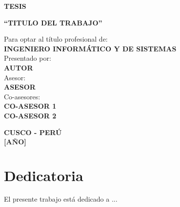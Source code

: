 \documentclass[12pt,oneside,a4paper]{book}
\theoremstyle{definition}
\begin{document}
\begin{center}
\vspace*{-0.6in}
\textbf{TESIS}\\
\topline
\vspace*{0.1in}
\begin{large}
\textbf{``TITULO DEL TRABAJO''} \\
\end{large}
\vspace*{0.08in}
\downline
\vspace*{0.25in}

\begin{minipage}{\linewidth}
  \large
  \centering    
  \begin{minipage}{0.45\linewidth}
  \end{minipage}
  \hspace{0.28\linewidth}
  \begin{minipage}{0.7\linewidth}
    \begin{normalsize}
    Para optar al título profesional de:
    \vspace*{-0.1in}
    \\\textbf{INGENIERO INFORMÁTICO Y DE SISTEMAS}\\
    Presentado por: \vspace*{-0.1in}
    \\\textbf{AUTOR}\\
    Asesor: \vspace*{-0.1in}
    \\\textbf{ASESOR}\\
    Co-asesores: \vspace*{-0.1in}
    \\\textbf{CO-ASESOR 1} \vspace*{-0.1in}
    \\\textbf{CO-ASESOR 2}
    \end{normalsize}
  \end{minipage}
\end{minipage}

\vspace*{0.5in}
\textbf{CUSCO - PERÚ} \\
\textbf{[A\~NO]}
\end{center}


\chapter*{Dedicatoria}
El presente trabajo está dedicado a ...
\end{document}
